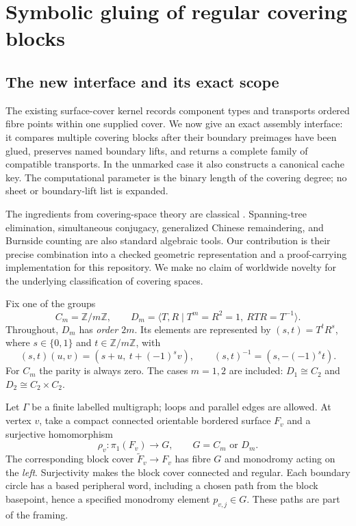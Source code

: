 \section{Symbolic gluing of regular covering blocks}
\label{sec:regular-cover-gluing}

\subsection{The new interface and its exact scope}

The existing surface-cover kernel records component types and transports
ordered fibre points within one supplied cover.  We now give an exact
assembly interface: it compares multiple covering blocks after their
boundary preimages have been glued, preserves named boundary lifts, and
returns a complete family of compatible transports.  In the unmarked case
it also constructs a canonical cache key.  The computational parameter is
the binary length of the covering degree; no sheet or boundary-lift list
is expanded.

The ingredients from covering-space theory are classical
\cite[Section 1.3]{hatcher-covering}.  Spanning-tree elimination,
simultaneous conjugacy, generalized Chinese remaindering, and Burnside
counting are also standard algebraic tools.  Our contribution is their
precise combination into a checked geometric representation and a
proof-carrying implementation for this repository.  We make no claim of
worldwide novelty for the underlying classification of covering spaces.

Fix one of the groups
\[
 C_m=\mathbb Z/m\mathbb Z,\qquad
 D_m=\langle T,R\mid T^m=R^2=1,\ RTR=T^{-1}\rangle.
\]
Throughout, $D_m$ has \emph{order $2m$}.  Its elements are represented by
$(s,t)=T^tR^s$, where $s\in\{0,1\}$ and $t\in\mathbb Z/m\mathbb Z$, with
\[
 (s,t)(u,v)=(s+u,\ t+(-1)^s v),\qquad
 (s,t)^{-1}=(s,-(-1)^s t).
\]
For $C_m$ the parity is always zero.  The cases $m=1,2$ are included:
$D_1\cong C_2$ and $D_2\cong C_2\times C_2$.

Let $\Gamma$ be a finite labelled multigraph; loops and parallel edges are
allowed.  At vertex $v$, take a compact connected orientable bordered
surface $F_v$ and a surjective homomorphism
\[
 \rho_v:\pi_1(F_v)\longrightarrow G,\qquad G=C_m\text{ or }D_m.
\]
The corresponding block cover $\widetilde F_v\to F_v$ has fibre $G$ and
monodromy acting on the \emph{left}.  Surjectivity makes the block cover
connected and regular.  Each boundary circle has a based peripheral word,
including a chosen path from the block basepoint, hence a specified
monodromy element $p_{v,j}\in G$.  These paths are part of the framing.

